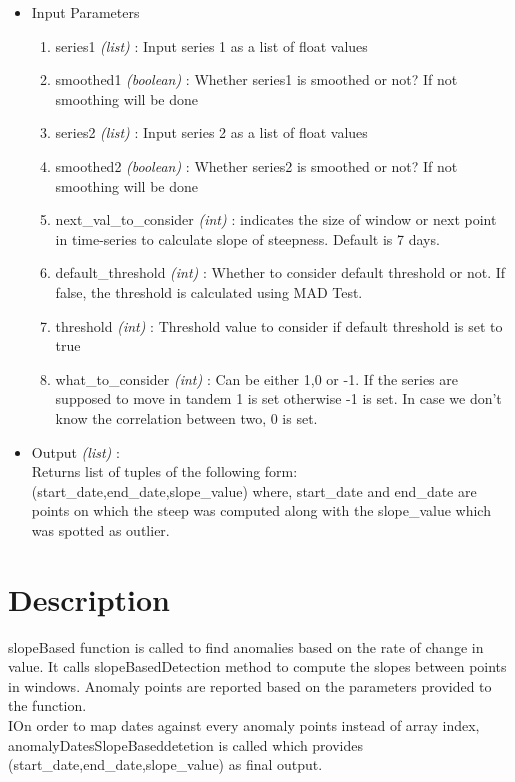 \begin{itemize}
 \item Input Parameters
 
 \begin{enumerate}
  \item series1 \textit{(list)} : Input series 1 as a list of float values
  \item smoothed1 \textit{(boolean)} : Whether series1 is smoothed or not? If not smoothing will be done
  \item series2 \textit{(list)} : Input series 2 as a list of float values
  \item smoothed2 \textit{(boolean)} : Whether series2 is smoothed or not? If not smoothing will be done
  \item next{\_}val{\_}to{\_}consider \textit{(int)} : indicates the size of window or next point in time-series to calculate slope of steepness. Default is 7 days.
  \item default{\_}threshold \textit{(int)} : Whether to consider default threshold or not. If false, the threshold is calculated using MAD Test.
  \item threshold \textit{(int)} : Threshold value to consider if default threshold is set to true
  \item what{\_}to{\_}consider \textit{(int)} : Can be either 1,0 or -1. If the series are supposed to move in tandem 1 is set otherwise -1 is set. In case we don't know the correlation between two, 0 is set.
  \end{enumerate}

 \item Output \textit{(list)} : \\
 	Returns list of tuples of the following form: \\ 
 	(start\_date,end\_date,slope\_value)
 	where, start\_date and end\_date are points on which the steep was computed along with the slope\_value which was spotted as outlier.
 
\end{itemize}

\section{Description}

slopeBased function is called to find anomalies based on the rate of change in value. It calls slopeBasedDetection method to compute the slopes between points in windows. 
Anomaly points are reported based on the parameters provided to the function. \\
IOn order to map dates against every anomaly points instead of array index, anomalyDatesSlopeBaseddetetion is called which provides (start\_date,end\_date,slope\_value) as final output.